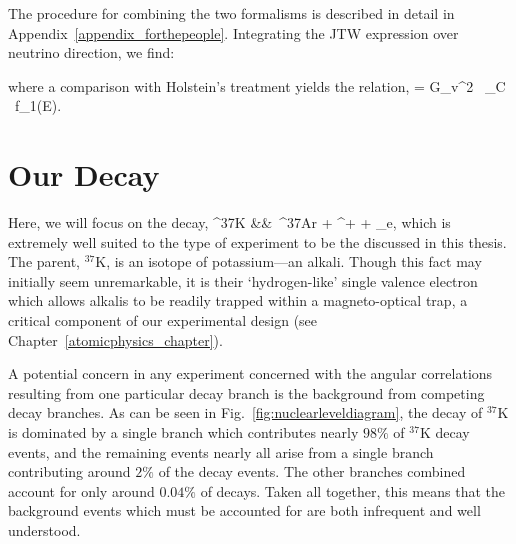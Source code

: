 	
	The procedure for combining the two formalisms is described in detail in Appendix~\ref{appendix_forthepeople}.  
Integrating the JTW expression over neutrino direction, we find:

where a comparison with Holstein's treatment yields the relation,
\bea
\xi = G_v^2 \, \cos\theta_C \, f_1(E).
\eea



\section{Our Decay}

Here, we will focus on the decay,
\bea
^{37}\textrm{K} &\rightarrow& \,^{37}\textrm{\!Ar} + \beta^{+} + \nu_e, 
\label{eq:ourdecay}
\eea
which is extremely well suited to the type of experiment to be the discussed in this thesis.  
The parent, $^{37}\textrm{K}$, is an isotope of potassium---an alkali.  Though this fact may initially seem unremarkable, it is their `hydrogen-like' single valence electron which allows alkalis to be readily trapped within a magneto-optical trap, a critical component of our experimental design (see Chapter~\ref{atomicphysics_chapter}).

A potential concern in any experiment concerned with the angular correlations resulting from one particular decay branch is the background from competing decay branches.  As can be seen in Fig.~\ref{fig:nuclearleveldiagram}, the decay of $^{37}\textrm{K}$ is dominated by a single branch which contributes nearly $98\%$ of $^{37}\textrm{K}$ decay events, and the remaining events nearly all arise from a single branch contributing around $2\%$ of the decay events.  The other branches combined account for only around $0.04\%$ of decays.  Taken all together, this means that the background events which must be accounted for are both infrequent and well understood.

